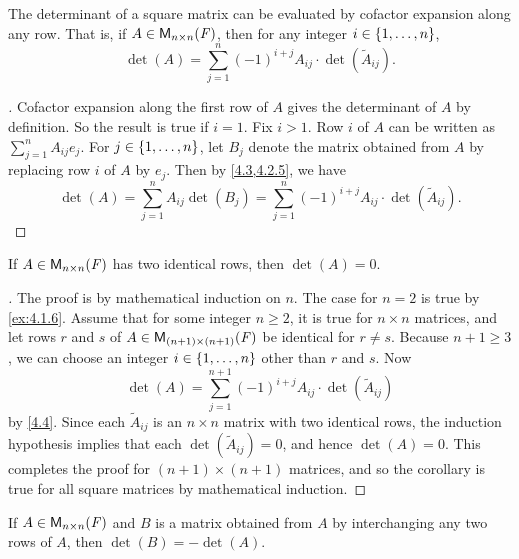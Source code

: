 \begin{thm}\label{4.4}
  The determinant of a square matrix can be evaluated by cofactor expansion along any row.
  That is, if \(A \in \ms[n][n][\F]\), then for any integer \(i \in \left\lbrace1, \dots, n\right\rbrace\),
  \[
    \det(A) = \sum_{j = 1}^n (-1)^{i + j} A_{i j} \cdot \det(\tilde{A}_{i j}).
  \]
\end{thm}

\begin{proof}[]
  Cofactor expansion along the first row of \(A\) gives the determinant of \(A\) by definition.
  So the result is true if \(i = 1\).
  Fix \(i > 1\).
  Row \(i\) of \(A\) can be written as \(\sum_{j = 1}^n A_{i j} e_j\).
  For \(j \in \left\lbrace1, \dots, n\right\rbrace\), let \(B_j\) denote the matrix obtained from \(A\) by replacing row \(i\) of \(A\) by \(e_j\).
  Then by \cref{4.3,4.2.5}, we have
  \[
    \det(A) = \sum_{j = 1}^n A_{i j} \det(B_j) = \sum_{j = 1}^n (-1)^{i + j} A_{i j} \cdot \det(\tilde{A}_{i j}).
  \]
\end{proof}

\begin{cor}\label{4.2.6}
  If \(A \in \ms[n][n][\F]\) has two identical rows, then \(\det(A) = 0\).
\end{cor}

\begin{proof}[]
  The proof is by mathematical induction on \(n\).
  The case for \(n = 2\) is true by \cref{ex:4.1.6}.
  Assume that for some integer \(n \geq 2\), it is true for \(n \times n\) matrices, and let rows \(r\) and \(s\) of \(A \in \ms[(n + 1)][(n + 1)][\F]\) be identical for \(r \neq s\).
  Because \(n + 1 \geq 3\), we can choose an integer \(i \in \left\lbrace1, \dots, n\right\rbrace\) other than \(r\) and \(s\).
  Now
  \[
    \det(A) = \sum_{j = 1}^{n + 1} (-1)^{i + j} A_{i j} \cdot \det(\tilde{A}_{i j})
  \]
  by \cref{4.4}.
  Since each \(\tilde{A}_{i j}\) is an \(n \times n\) matrix with two identical rows, the induction hypothesis implies that each \(\det(\tilde{A}_{i j}) = 0\), and hence \(\det(A) = 0\).
  This completes the proof for \((n + 1) \times (n + 1)\) matrices, and so the corollary is true for all square matrices by mathematical induction.
\end{proof}

\begin{thm}\label{4.5}
  If \(A \in \ms[n][n][\F]\) and \(B\) is a matrix obtained from \(A\) by interchanging any two rows of \(A\), then \(\det(B) = -\det(A)\).
\end{thm}

